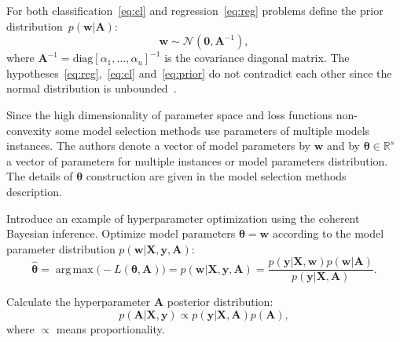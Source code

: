 \documentclass[smallextended]{svjour3}
\DeclareMathOperator*{\argmax}{arg\,max}
\begin{document}
For both classification~\eqref{eq:cl} and regression~\eqref{eq:reg} problems define the prior distribution~$p(\mathbf{w}|\mathbf{A})$:
\begin{equation}
\label{eq:prior}
	\mathbf{w} \sim \mathcal{N}(\mathbf{0}, \mathbf{A}^{-1}),
\end{equation}
where  $\mathbf{A}^{-1} = \text{diag}[\alpha_1, \dots, \alpha_u]^{-1}$ is the covariance  diagonal matrix. The hypotheses~\eqref{eq:reg},~\eqref{eq:cl} and~\eqref{eq:prior} 	do	not	contradict	each other since the normal distribution is unbounded~\cite{bayes_constr}.  


Since the high dimensionality  of parameter space and loss functions non-convexity some model selection methods use parameters of multiple models instances. The authors denote  a vector of model parameters by $\mathbf{w}$ and by $\boldsymbol{\theta} \in \mathbb{R}^s$ a vector of parameters for multiple instances or model parameters distribution. The details of $\boldsymbol{\theta}$ construction are given in the model selection methods description.

Introduce an example of hyperparameter optimization using the coherent Bayesian inference. Optimize model parameters $\boldsymbol{\theta} = \mathbf{w}$ according to the model parameter distribution $p(\mathbf{w}|\mathbf{X}, \mathbf{y}, \mathbf{A})$:
\begin{equation}
\label{eq:bayes1}
\hat{\boldsymbol{\theta}} = \argmax \bigl(-L(\boldsymbol{\theta}, \mathbf{A})\bigr) = p(\mathbf{w}|\mathbf{X}, \mathbf{y}, \mathbf{A}) = \frac{p(\mathbf{y}|\mathbf{X},\mathbf{w})p(\mathbf{w}|\mathbf{A})}{p(\mathbf{y}|\mathbf{X},\mathbf{A})}.
\end{equation}

Calculate the hyperparameter  $\mathbf{A}$ posterior distribution:
\[
p(\mathbf{A}|\mathbf{X}, \mathbf{y}) \propto p(\mathbf{y}|\mathbf{X},\mathbf{A})p(\mathbf{A}),
\]
where $\propto$ means proportionality.
\end{document}
